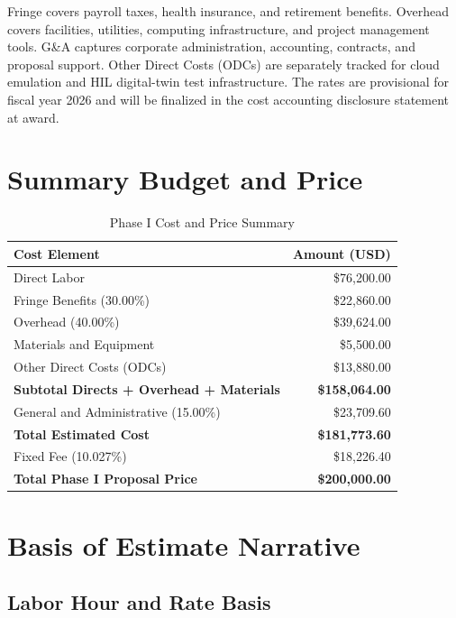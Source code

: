 \documentclass[10pt]{article}
\begin{document}
\smallskip
Fringe covers payroll taxes, health insurance, and retirement benefits. Overhead covers facilities, utilities, computing infrastructure, and project management tools. G\&A captures corporate administration, accounting, contracts, and proposal support. Other Direct Costs (ODCs) are separately tracked for cloud emulation and HIL digital-twin test infrastructure. The rates are provisional for fiscal year 2026 and will be finalized in the cost accounting disclosure statement at award.

\section{Summary Budget and Price}

\begin{table}[H]
\centering
\small
\caption{Phase I Cost and Price Summary}
\label{tab:summary}
\begin{tabular}{@{}lr@{}}
\toprule
\textbf{Cost Element} & \textbf{Amount (USD)} \\
\midrule
Direct Labor & \$76,200.00 \\
Fringe Benefits (30.00\%) & \$22,860.00 \\
Overhead (40.00\%) & \$39,624.00 \\
Materials and Equipment & \$5,500.00 \\
Other Direct Costs (ODCs) & \$13,880.00 \\
\midrule
\textbf{Subtotal Directs + Overhead + Materials} & \textbf{\$158,064.00} \\
General and Administrative (15.00\%) & \$23,709.60 \\
\midrule
\textbf{Total Estimated Cost} & \textbf{\$181,773.60} \\
Fixed Fee (10.027\%) & \$18,226.40 \\
\midrule
\textbf{Total Phase I Proposal Price} & \textbf{\$200,000.00} \\
\bottomrule
\end{tabular}
\end{table}

\section{Basis of Estimate Narrative}

\subsection{Labor Hour and Rate Basis}
\end{document}
